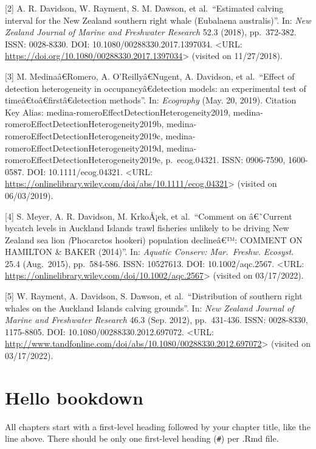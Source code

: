 \documentclass[
]{article}
\theoremstyle{definition}
\theoremstyle{definition}
\theoremstyle{definition}
\theoremstyle{definition}
\theoremstyle{remark}
\begin{document}
{[}2{]} A. R. Davidson, W. Rayment, S. M. Dawson, et al.~``Estimated calving
interval for the New Zealand southern right whale (Eubalaena
australis)''. In: \emph{New Zealand Journal of Marine and Freshwater
Research} 52.3 (2018), pp.~372-382. ISSN: 0028-8330. DOI:
10.1080/00288330.2017.1397034. \textless URL:
\url{https://doi.org/10.1080/00288330.2017.1397034}\textgreater{} (visited on 11/27/2018).

{[}3{]} M. Medinaâ€Romero, A. O'Reillyâ€Nugent, A. Davidson, et al.~``Effect
of detection heterogeneity in occupancyâ€detection models: an
experimental test of timeâ€toâ€firstâ€detection methods''. In:
\emph{Ecography} (May. 20, 2019). Citation Key Alias:
medina-romeroEffectDetectionHeterogeneity2019,
medina-romeroEffectDetectionHeterogeneity2019b,
medina-romeroEffectDetectionHeterogeneity2019c,
medina-romeroEffectDetectionHeterogeneity2019d,
medina-romeroEffectDetectionHeterogeneity2019e, p.~ecog.04321. ISSN:
0906-7590, 1600-0587. DOI: 10.1111/ecog.04321. \textless URL:
\url{https://onlinelibrary.wiley.com/doi/abs/10.1111/ecog.04321}\textgreater{} (visited on
06/03/2019).

{[}4{]} S. Meyer, A. R. Davidson, M. KrkoÅ¡ek, et al.~``Comment on
â€˜Current bycatch levels in Auckland Islands trawl fisheries unlikely
to be driving New Zealand sea lion \textit(Phocarctos hookeri)
population declineâ€™: COMMENT ON HAMILTON \& BAKER (2014)''. In:
\emph{Aquatic Conserv: Mar.~Freshw. Ecosyst.} 25.4 (Aug.~2015), pp.~584-586.
ISSN: 10527613. DOI: 10.1002/aqc.2567. \textless URL:
\url{https://onlinelibrary.wiley.com/doi/10.1002/aqc.2567}\textgreater{} (visited on
03/17/2022).

{[}5{]} W. Rayment, A. Davidson, S. Dawson, et al.~``Distribution of
southern right whales on the Auckland Islands calving grounds''. In:
\emph{New Zealand Journal of Marine and Freshwater Research} 46.3 (Sep.
2012), pp.~431-436. ISSN: 0028-8330, 1175-8805. DOI:
10.1080/00288330.2012.697072. \textless URL:
\url{http://www.tandfonline.com/doi/abs/10.1080/00288330.2012.697072}\textgreater{}
(visited on 03/17/2022).

\hypertarget{hello-bookdown-1}{%
\section{Hello bookdown}\label{hello-bookdown-1}}

All chapters start with a first-level heading followed by your chapter title, like the line above. There should be only one first-level heading (\texttt{\#}) per .Rmd file.
\end{document}
